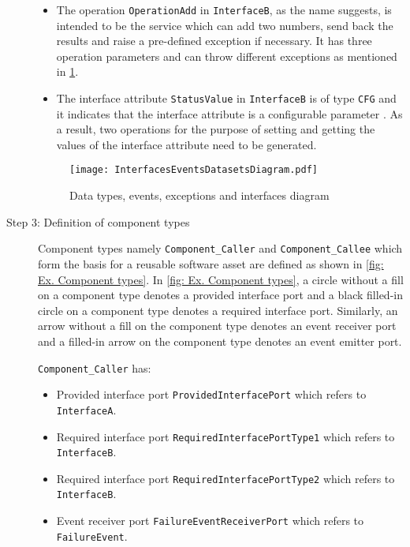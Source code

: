 \begin{description}
\begin{itemize}
\item The operation \texttt{OperationAdd} in \texttt{InterfaceB}, as the name suggests, is intended to be the service which can add two numbers, send back the results and raise a pre-defined exception if necessary. It has three operation parameters and can throw different exceptions as mentioned in \cref{fig: Ex. Datatypes etc.}. 

\item The interface attribute \texttt{StatusValue} in \texttt{InterfaceB} is of type \texttt{CFG} and it indicates that the interface attribute is a configurable parameter \cite{SpecMetamodel}. As a result, two operations for the purpose of setting and getting the values of the interface attribute need to be generated.      
\end{itemize}

\begin{figure}[h]
	\centering
	\texttt{[image: InterfacesEventsDatasetsDiagram.pdf]}
	\caption{Data types, events, exceptions and interfaces diagram}
	\label{fig: Ex. Datatypes etc.}
\end{figure}

\item [Step 3: Definition of component types] Component types namely \texttt{Component\allowbreak\_Caller} and \texttt{Component\allowbreak\_Callee} which form the basis for a reusable software asset are defined as shown in \cref{fig: Ex. Component types}. In \cref{fig: Ex. Component types}, a circle without a fill on a component type denotes a provided interface port and a black filled-in circle on a component type denotes a required interface port. Similarly, an arrow without a fill on the component type denotes an event receiver port and a filled-in arrow on the component type denotes an event emitter port.

\texttt{Component\allowbreak\_Caller} has:
\begin{itemize}
\item Provided interface port \texttt{Provided\allowbreak Interface\allowbreak Port} which refers to \texttt{InterfaceA}.
\item Required interface port \texttt{Required\allowbreak Interface\allowbreak PortType1} which refers to \texttt{InterfaceB}.
\item Required interface port \texttt{Required\allowbreak Interface\allowbreak PortType2} which refers to \texttt{InterfaceB}.
\item Event receiver port \texttt{FailureEvent\allowbreak ReceiverPort} which refers to \texttt{Failure\allowbreak Event}.
\end{itemize}


\end{description}
